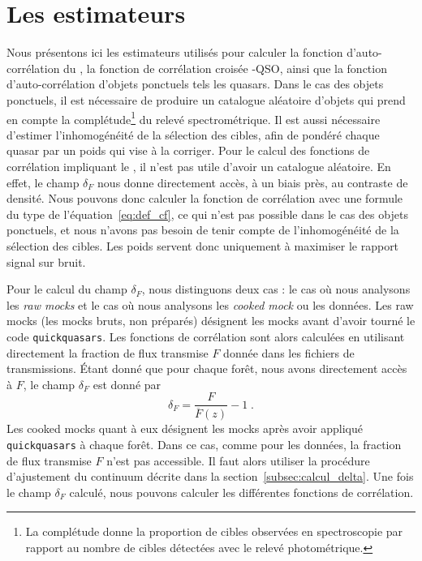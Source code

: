 \section{Les estimateurs}
\label{sec:estimateurs}
Nous présentons ici les estimateurs utilisés pour calculer la fonction d'auto-corrélation du \lya{}, la fonction de corrélation croisée \lya{}-QSO, ainsi que la fonction d'auto-corrélation d'objets ponctuels tels les quasars.
  Dans le cas des objets ponctuels, il est nécessaire de produire un catalogue aléatoire d'objets qui prend en compte la complétude\footnote{La complétude donne la proportion de cibles observées en spectroscopie par rapport au nombre de cibles détectées avec le relevé photométrique.} du relevé spectrométrique. %
  Il est aussi nécessaire d'estimer l'inhomogénéité de la sélection des cibles, afin de pondéré chaque quasar par un poids qui vise à la corriger.
Pour le calcul des fonctions de corrélation impliquant le \lya{}, il n'est pas utile d'avoir un catalogue aléatoire. En effet, le champ $\delta_F$ nous donne directement accès, à un biais près, au contraste de densité. Nous pouvons donc calculer la fonction de corrélation avec une formule du type de l'équation~\ref{eq:def_cf}, ce qui n'est pas possible dans le cas des objets ponctuels, et nous n'avons pas besoin de tenir compte de l'inhomogénéité de la sélection des cibles. Les poids servent donc uniquement à maximiser le rapport signal sur bruit.

Pour le calcul du champ $\delta_F$, nous distinguons deux cas : le cas où nous analysons les \emph{raw mocks} et le cas où nous analysons les \emph{cooked mock} ou les données.
Les raw mocks (les mocks bruts, non préparés) désignent les mocks avant d'avoir tourné le code \texttt{quickquasars}.
Les fonctions de corrélation sont alors calculées en utilisant directement la fraction de flux transmise $F$ donnée dans les fichiers de transmissions. Étant donné que pour chaque forêt, nous avons directement accès à $F$, le champ $\delta_F$ est donné par
\begin{equation}
  \delta_F = \frac{F}{\overline F(z)} - 1 \; .
\end{equation}
Les cooked mocks quant à eux désignent les mocks après avoir appliqué \texttt{quickquasars} à chaque forêt. Dans ce cas, comme pour les données, la fraction de flux transmise $F$ n'est pas accessible. Il faut alors utiliser la procédure d'ajustement du continuum décrite dans la section~\ref{subsec:calcul_delta}.
Une fois le champ $\delta_F$ calculé, nous pouvons calculer les différentes fonctions de corrélation.

